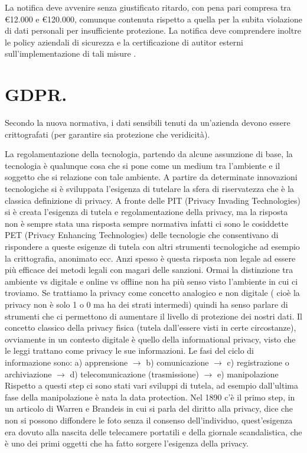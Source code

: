 \documentclass[a4page, 11pt, twocolumn]{article}
\begin{document}
La notifica deve avvenire senza giustificato ritardo, con pena pari compresa tra \euro{12.000} e \euro{120.000}, comunque contenuta rispetto a quella per la subita violazione di dati personali per insufficiente protezione.
La notifica deve comprendere inoltre le policy aziendali di sicurezza e la certificazione di autitor esterni sull'implementazione di tali misure	.

\section{GDPR.}
Secondo la nuova normativa, i dati sensibili tenuti da un'azienda devono essere crittografati (per garantire sia protezione che veridicità).

La regolamentazione della tecnologia, partendo da alcune assunzione di base, la tecnologia è qualunque cosa che si pone come un medium tra l’ambiente e il soggetto che si relazione con tale ambiente. A partire da determinate innovazioni tecnologiche si è sviluppata l’esigenza di tutelare la sfera di riservatezza che è la classica definizione di privacy. A fronte delle PIT (Privacy Invading Technologies) si è creata l’esigenza di tutela e regolamentazione della privacy, ma la risposta non è sempre stata una risposta sempre normativa infatti ci sono le cosiddette PET (Privacy Enhancing Technologies) delle tecnologie che consentivano di rispondere a queste esigenze di tutela con altri strumenti tecnologiche ad esempio la crittografia, anonimato ecc. Anzi spesso è questa risposta non legale ad essere più efficace dei metodi legali con magari delle sanzioni. Ormai la distinzione tra ambiente vs digitale e online vs offline non ha più senso visto l’ambiente in cui ci troviamo. \newline
Se trattiamo la privacy come concetto analogico e non digitale ( cioè la privacy non è solo 1 o 0 ma ha dei strati intermedi) quindi ha senso parlare di strumenti che ci permettono di aumentare il livello di protezione dei nostri dati. Il concetto classico della privacy fisica (tutela dall’essere visti in certe circostanze), ovviamente in un contesto digitale è quello della informational privacy, visto che le leggi trattano come privacy le sue informazioni. \newline
Le fasi del ciclo di informazione sono: 
a) apprensione $\rightarrow$ b) comunicazione $\rightarrow$ c) registrazione o archiviazione $\rightarrow$ d) telecomunicazione (trasmissione) $\rightarrow$ e) manipolazione \newline
Rispetto a questi step ci sono stati vari sviluppi di tutela, ad esempio dall’ultima fase della manipolazione è nata la data protection. Nel 1890 c'è il primo step, in un articolo di Warren e Brandeis in cui si parla del diritto alla privacy, dice che non si possono diffondere le foto senza il consenso dell’individuo, quest'esigenza era dovuto alla nascita delle telecamere portatili e della giornale scandalistica, che è uno dei primi oggetti che ha fatto sorgere l’esigenza della privacy.\newline
\end{document}
